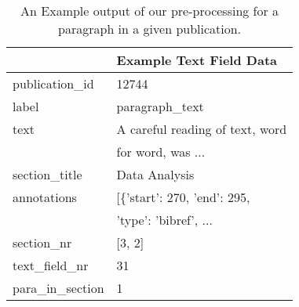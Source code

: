 \begin{table}[h]
    \centering
     \caption{An Example output of our pre-processing for a paragraph in a given publication.}
    \begin{tabular}{ll}
        \toprule
        {} &                            Example Text Field Data\\
        \midrule
        publication\_id     &                                              12744 \\
        
        label              &              paragraph\_text \\
        text               &  A careful reading of text, word\\
                    & for word, was ... \\
        section\_title      &               Data Analysis \\
        annotations        &  [\{'start': 270, 'end': 295,\\
                           &        'type': 'bibref', ... \\
        
        section\_nr         &                                             [3, 2] \\

        text\_field\_nr      &                                                 31 \\
        para\_in\_section    &                                                  1 \\
        
        \bottomrule
    \end{tabular}
    \label{tab:example-paragraph}
\end{table}

